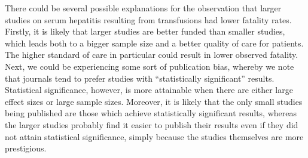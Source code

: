 \documentclass[11pt]{article}
\begin{document}
There could be several possible explanations for the observation that larger studies on serum hepatitis resulting from transfusions had lower fatality rates. Firstly, it is likely that larger studies are better funded than smaller studies, which leads both to a bigger sample size and a better quality of care for patients. The higher standard of care in particular could result in lower observed fatality. Next, we could be experiencing some sort of publication bias, whereby we note that journals tend to prefer studies with ``statistically significant'' results. Statistical significance, however, is more attainable when there are either large effect sizes or large sample sizes. Moreover, it is likely that the only small studies being published are those which achieve statistically significant results, whereas the larger studies probably find it easier to publish their results even if they did not attain statistical significance, simply because the studies themselves are more prestigious.
%
\end{document}

